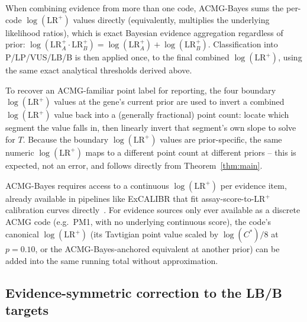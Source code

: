 \documentclass[11pt]{article}
\newcommand{\excalibr}{ExCALIBR\xspace}
\newcommand{\lrp}{\mathrm{LR}^{+}}
\begin{document}
When combining evidence from more than one code, ACMG-Bayes sums the
per-code $\log(\lrp)$ values directly (equivalently, multiplies the
underlying likelihood ratios), which is exact Bayesian evidence aggregation
regardless of prior:
$\log(\lrp_A \cdot \lrp_B) = \log(\lrp_A) + \log(\lrp_B)$. Classification
into P/LP/VUS/LB/B is then applied once, to the final combined
$\log(\lrp)$, using the same exact analytical thresholds derived above.

To recover an ACMG-familiar point label for reporting, the four boundary
$\log(\lrp)$ values at the gene's current prior are used to invert a
combined $\log(\lrp)$ value back into a (generally fractional) point count:
locate which segment the value falls in, then linearly invert that
segment's own slope to solve for $T$. Because the boundary $\log(\lrp)$
values are prior-specific, the same numeric $\log(\lrp)$ maps to a
different point count at different priors -- this is expected, not an
error, and follows directly from Theorem~\ref{thm:main}.

ACMG-Bayes requires access to a continuous $\log(\lrp)$ per evidence item,
already available in pipelines like \excalibr that fit assay-score-to-LR$^+$
calibration curves directly~\cite{igvf_pp}. For evidence sources only ever
available as a discrete ACMG code (e.g.\ PM1, with no underlying continuous
score), the code's canonical $\log(\lrp)$ (its Tavtigian point value scaled
by $\log(C^*)/8$ at $p=0.10$, or the ACMG-Bayes-anchored equivalent at
another prior) can be added into the same running total without
approximation.

\subsection*{Evidence-symmetric correction to the LB/B targets}
\label{sec:target_symmetry}
\end{document}
